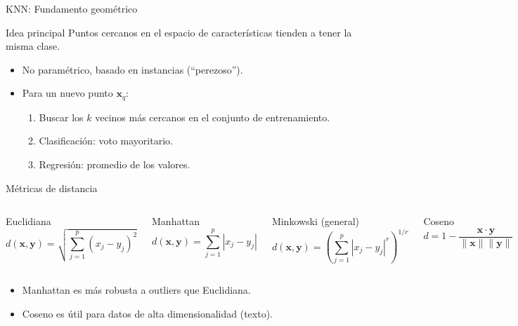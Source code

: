 \documentclass[aspectratio=169, 10pt, xcolor=table]{beamer}
\begin{document}
\begin{frame}{KNN: Fundamento geométrico}
    \begin{block}{Idea principal}
        Puntos cercanos en el espacio de características tienden a tener la misma clase.
    \end{block}
    \begin{itemize}
        \item No paramétrico, basado en instancias (``perezoso'').
        \item Para un nuevo punto $\mathbf{x}_q$:
        \begin{enumerate}
            \item Buscar los $k$ vecinos más cercanos en el conjunto de entrenamiento.
            \item Clasificación: voto mayoritario.
            \item Regresión: promedio de los valores.
        \end{enumerate}
    \end{itemize}
\end{frame}

\begin{frame}{Métricas de distancia}
    \begin{columns}[t]
        \begin{block}{Euclidiana}
            \[
            d(\mathbf{x},\mathbf{y}) = \sqrt{\sum_{j=1}^p (x_j - y_j)^2}
            \]
        \end{block}
        \begin{block}{Manhattan}
            \[
            d(\mathbf{x},\mathbf{y}) = \sum_{j=1}^p |x_j - y_j|
            \]
        \end{block}
        \begin{block}{Minkowski (general)}
            \[
            d(\mathbf{x},\mathbf{y}) = \left(\sum_{j=1}^p |x_j - y_j|^r\right)^{1/r}
            \]
        \end{block}
        \begin{block}{Coseno}
            \[
            d = 1 - \frac{\mathbf{x}\cdot\mathbf{y}}{\|\mathbf{x}\|\|\mathbf{y}\|}
            \]
        \end{block}
    \end{columns}
    \vspace{0.2cm}
    \begin{itemize}
        \item Manhattan es más robusta a outliers que Euclidiana.
        \item Coseno es útil para datos de alta dimensionalidad (texto).
    \end{itemize}
\end{frame}
\end{document}
